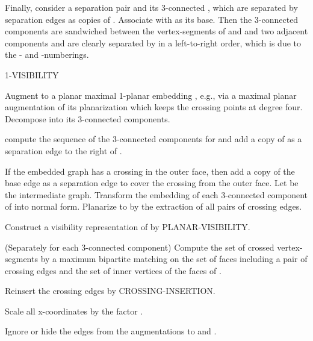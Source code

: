 \documentclass[runningheads]{llncs}
\begin{document}
Finally, consider a separation pair  and its 3-connected
, which are separated by separation edges
 as copies of . Associate  with
 as its base. Then the 3-connected components are sandwiched
between the vertex-segments of  and  and two adjacent
components  and  are clearly separated by  in a
left-to-right order, which is due to the - and
-numberings.








\begin{algorithm}

  \caption{1-VISIBILITY}\label{alg:1-visibility}


  Augment  to a planar maximal 1-planar embedding ,
  e.g., via a maximal planar augmentation of its planarization which keeps the crossing
  points at degree four.\;
  Decompose  into its 3-connected components.\;

    {compute the sequence of the 3-connected components
   for  and add a copy  of 
  as a separation edge to the right of .
  }

  If the embedded graph has a crossing in the outer face, then
  add a copy of the base edge as a separation edge to cover the crossing from the outer face.
  Let  be the intermediate graph. \;
  Transform the embedding of each 3-connected component of  into normal
  form.\;
  Planarize  to 
     by the extraction of  all pairs of crossing  edges.\;

     Construct a visibility representation of 
     by PLANAR-VISIBILITY.\;

     (Separately for each 3-connected component) Compute the set of crossed vertex-segments by a
     maximum bipartite matching on the set of faces  including a pair of crossing
     edges and the set    of inner vertices of the faces of .\;

     Reinsert the crossing edges by CROSSING-INSERTION.\;

    Scale all x-coordinates by the factor . \;

    Ignore or hide the edges from the augmentations to  and .

\end{algorithm}
\end{document}

